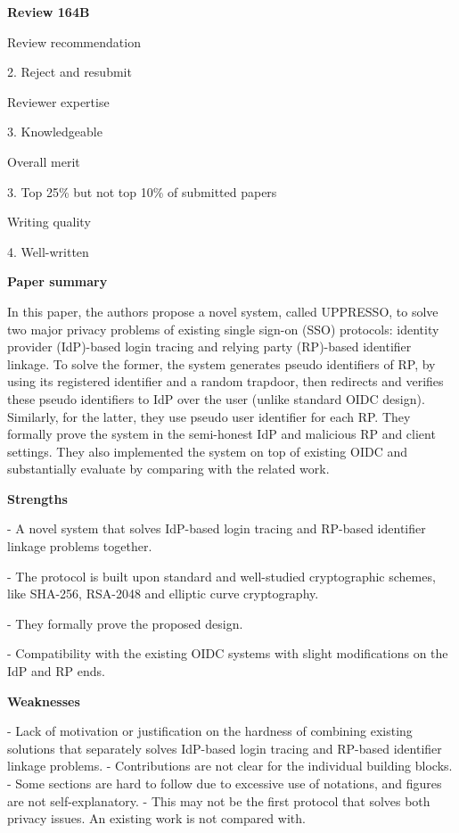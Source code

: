 \documentclass[letterpaper,onecolumn,10pt]{article}
\begin{document}
\vspace{1mm}\noindent\textbf{Review 164B}


Review recommendation


2. Reject and resubmit

Reviewer expertise


3. Knowledgeable

Overall merit


3. Top 25\% but not top 10\% of submitted papers

Writing quality


4. Well-written

\vspace{1mm}\noindent\textbf{Paper summary}


In this paper, the authors propose a novel system, called UPPRESSO, to solve two major privacy problems of existing single sign-on (SSO) protocols: identity provider (IdP)-based login tracing and relying party (RP)-based identifier linkage. To solve the former, the system generates pseudo identifiers of RP, by using its registered identifier and a random trapdoor, then redirects and verifies these pseudo identifiers to IdP over the user (unlike standard OIDC design). Similarly, for the latter, they use pseudo user identifier for each RP. They formally prove the system in the semi-honest IdP and malicious RP and client settings. They also implemented the system on top of existing OIDC and substantially evaluate by comparing with the related work.

\vspace{1mm}\noindent\textbf{Strengths}


-	A novel system that solves IdP-based login tracing and RP-based identifier linkage problems together.

-	The protocol is built upon standard and well-studied cryptographic schemes, like SHA-256, RSA-2048 and elliptic curve cryptography.

-	They formally prove the proposed design.

-	Compatibility with the existing OIDC systems with slight modifications on the IdP and RP ends.

\vspace{1mm}\noindent\textbf{Weaknesses}


-	Lack of motivation or justification on the hardness of combining existing solutions that separately solves IdP-based login tracing and RP-based identifier linkage problems.
-	Contributions are not clear for the individual building blocks.
-	Some sections are hard to follow due to excessive use of notations, and figures are not self-explanatory.  
-	This may not be the first protocol that solves both privacy issues. An existing work is not compared with.
\end{document}
